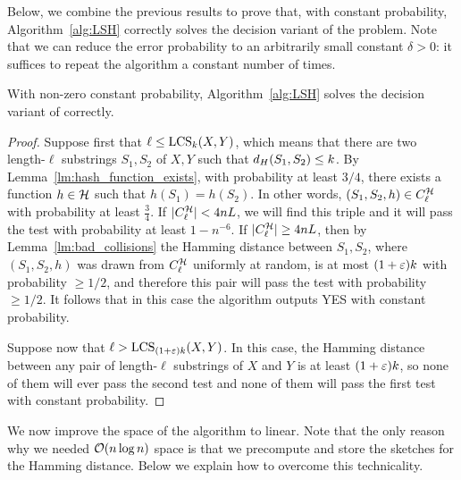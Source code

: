 Below, we combine the previous results to prove that, with constant probability, Algorithm~\ref{alg:LSH} correctly solves
the decision variant of the \kApproxLCS problem.
Note that we can reduce the error probability to an arbitrarily small constant $\delta>0$: it suffices to repeat the algorithm a constant number of times. 

\begin{corollary}
With non-zero constant probability, Algorithm~\ref{alg:LSH} solves the decision variant of \kApproxLCS correctly.
\end{corollary}
\begin{proof}
Suppose first that $\ell \le \mathrm{LCS}_{k}(X,Y)$, which means that there are two length-$\ell$ substrings $S_1, S_2$ of $X, Y$ such that $d_H(S_1, S_2) \le k$. By Lemma~\ref{lm:hash_function_exists}, with probability at least $3/4$, there exists a function $h\in \mathcal{H}$ such that $h(S_1)=h(S_2)$.
In other words, $(S_1, S_2, h) \in C^{\mathcal{H}}_{\ell}$ with probability at least $\frac34$. If $|C^{\mathcal{H}}_{\ell}| < 4nL$, we will find this triple and it will pass the test with probability at least $1-n^{-6}$.
If $|C^{\mathcal{H}}_{\ell}| \ge 4nL$, then by Lemma~\ref{lm:bad_collisions} the Hamming distance between $S_1, S_2$, where $(S_1, S_2, h)$ was drawn from $C^{\mathcal{H}}_{\ell}$ uniformly at random, is at most $(1+\varepsilon)k$ with probability $\ge 1/2$, and therefore this pair will pass the test with probability $\ge 1/2$. It follows that in this case the algorithm outputs YES with constant probability.

Suppose now that $\ell > \mathrm{LCS}_{(1+\varepsilon)k}(X,Y)$. In this case, the Hamming distance between any pair of length-$\ell$ substrings of $X$ and $Y$ is at least $(1+\varepsilon)k$, so none of them will ever pass the second test and none of them will pass the first test with constant probability.
\end{proof}

We now improve the space of the algorithm to linear. Note that the only reason why we needed $\mathcal{O}(n \log n)$ space is that we precompute and store the sketches for the Hamming distance. Below we explain how to overcome this technicality.

